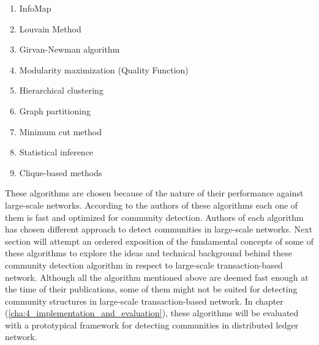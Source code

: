 \begin{enumerate}
	\item InfoMap
	\item Louvain Method
	\item Girvan-Newman algorithm
    \item Modularity maximization (Quality Function)
    \item Hierarchical clustering
	\item Graph partitioning
	\item Minimum cut method
	\item Statistical inference
	\item Clique-based methods
\end{enumerate}

These algorithms are chosen because of the nature of their performance against large-scale networks. According to the authors of these algorithms each one of them is fast and optimized for community detection. Authors of each algorithm has chosen different approach to detect communities in large-scale networks. Next section will attempt an ordered exposition of the fundamental concepts of some of these algorithms to explore the ideas and technical background behind these community detection algorithm in respect to large-scale transaction-based network. Although all the algorithm mentioned above are deemed fast enough at the time of their publications, some of them might not be suited for detecting community structures in large-scale transaction-based network. In chapter (\ref{cha:4_implementation_and_evaluation}), these algorithms will be evaluated with a prototypical framework for detecting communities in distributed ledger network.

